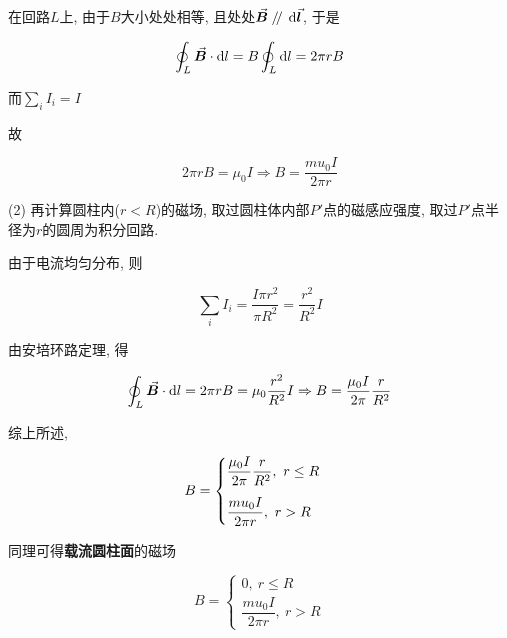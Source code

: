 \begin{example}
\begin{solution}
	    在回路$L$上, 由于$B$大小处处相等, 且处处$\va*{B} \kern 0.56em/\kern -0.8em /\kern 0.56em \dd{\va*{l}}$, 于是
	    
	    \begin{equation*}
	    	\oint_{L} \va*{B} \cdot \dd{l} = B \oint_{L} \dd{l} = 2 \pi r B
	    \end{equation*}
	    
		而$\sum\limits_{i} I_i = I$
		
		故
		
		\begin{equation*}
			2 \pi r B = \mu_0 I \Rightarrow B = \dfrac{mu_0 I}{2 \pi r}
		\end{equation*}
		
		(2) 再计算圆柱内($r < R$)的磁场, 取过圆柱体内部$P'$点的磁感应强度, 取过$P'$点半径为$r$的圆周为积分回路. 
		
		由于电流均匀分布, 则
		
		\begin{equation*}
			\sum\limits_{i} I_i = \dfrac{I \pi r^2}{\pi R^2} = 
			\dfrac{r^2}{R^2} I
		\end{equation*}
		
		由安培环路定理, 得
		
		\begin{equation*}
			\oint_{L} \va*{B} \cdot \dd{l} = 2 \pi r B = \mu_0 \dfrac{r^2}{R^2} I \Rightarrow B = \dfrac{\mu_0 I}{2 \pi} \dfrac{r}{R^2}
		\end{equation*}
		
		综上所述, 
		
		\begin{equation*}
			B = \begin{cases}
				\dfrac{\mu_0 I}{2 \pi} \dfrac{r}{R^2},~r \leq R \vspace{2ex} \\
				\dfrac{mu_0 I}{2 \pi r},~r > R
			\end{cases}
		\end{equation*}
		
		同理可得\textbf{载流圆柱面}的磁场
		
		\begin{equation*}
			B = \begin{cases}
				0,~r \leq R \\
				\dfrac{mu_0 I}{2 \pi r},~r > R
			\end{cases}
		\end{equation*}
		
	\end{solution}
	
\end{example}

